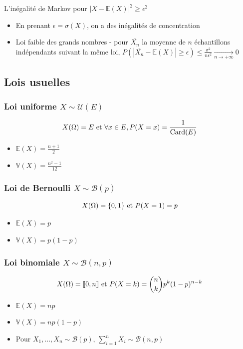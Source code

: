 \documentclass[openany]{book}
\begin{document}
L'inégalité de Markov pour $|X - \mathbb{E}(X)|^2 \geq \epsilon^2$

\begin{itemize}
    \item En prenant $\epsilon = \sigma(X)$, on a des inégalités de concentration
    \item Loi faible des grands nombres - pour $\overline{X_n}$ la moyenne de $n$ échantillons indépendants suivant la même loi, $P(|\overline{X_n} - \mathbb{E}(X)| \geq \epsilon) \leq \frac{\sigma^2}{n \epsilon^2} \underset{n \rightarrow +\infty}{\longrightarrow} 0 $
\end{itemize}

\subsection{Lois usuelles}
\subsubsection{Loi uniforme $ X \sim \mathcal{U}(E) $}

\[ X(\Omega) = E \text{ et } \forall x \in E, P(X=x) = \frac{1}{\text{Card}(E)} \]

\begin{itemize}
    \item $\mathbb{E}(X) = \frac{n+1}{2}$
    \item $\mathbb{V}(X) = \frac{n^2-1}{12}$
\end{itemize}

\subsubsection{Loi de Bernoulli $ X \sim \mathcal{B}(p) $}

\[ X(\Omega) = \{0, 1\} \text{ et } P(X=1) = p \]

\begin{itemize}
    \item $\mathbb{E}(X) = p$
    \item $\mathbb{V}(X) = p(1-p)$
\end{itemize}

\subsubsection{Loi binomiale $ X \sim \mathcal{B}(n, p) $}

\[ X(\Omega) = \llbracket 0, n \rrbracket \text{ et } P(X=k) = \binom{n}{k} p^k (1-p)^{n-k} \]

\begin{itemize}
    \item $\mathbb{E}(X) = np$
    \item $\mathbb{V}(X) = np(1-p)$
    \item Pour $X_1,\dots,X_n \sim \mathcal{B}(p)$, $\sum_{i=1}^{n} X_i \sim \mathcal{B}(n, p)$ 
\end{itemize}
\end{document}
